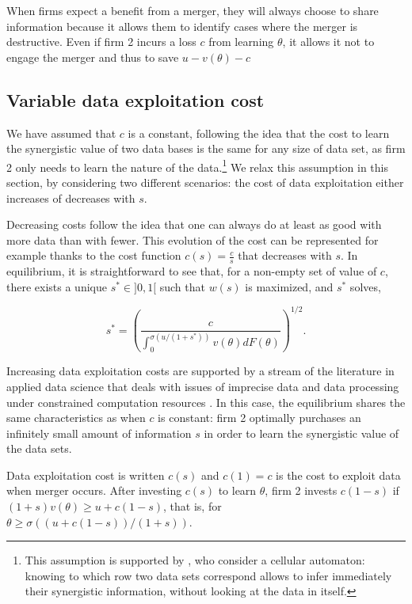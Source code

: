 \documentclass[a4paper,leqno]{article}%
\renewcommand{\t}{\theta}
\newcommand{\s}{\sigma}
\begin{document}
\medskip

When firms expect a benefit from a merger, they will always choose to share information because it allows them to identify cases where the merger is destructive. Even if firm 2 incurs a loss $c$ from learning $\t$, it allows it not to engage the merger and thus to save $u-v(\t)-c$

\medskip

\subsection{Variable data exploitation cost}

\medskip

We have assumed that $c$ is a constant, following the idea that the cost to learn the synergistic value of two data bases is the same for any size of data set, as firm 2 only needs to learn the nature of the data.\footnote{This assumption is supported by \cite{sootla2017analyzing}, who consider a cellular automaton: knowing to which row two data sets correspond allows to infer immediately their synergistic information, without looking at the data in itself.} We relax this assumption in this section, by considering two different scenarios: the cost of data exploitation either increases of decreases with $s$.

\medskip

Decreasing costs follow the idea that one can always do at least as good with more data than with fewer. This evolution of the cost can be represented for example thanks to the cost function $c(s)=\frac{c}{s}$ that decreases with $s$. In equilibrium, it is straightforward to see that, for a non-empty set of value of $c$, there exists a unique $s^*\in]0,1[$ such that $w(s)$ is maximized, and $s^*$ solves,

$$s^*=\left(\frac{c}{\int_0^{\s(u/(1+s^*))}v(\t)dF(\t)}\right)^{1/2}.$$

\medskip

Increasing data exploitation costs are supported by a stream of the literature in applied data science that deals with issues of imprecise data and data processing under constrained computation resources \citep{hernandez1995merge}. In this case, the equilibrium shares the same characteristics as when $c$ is constant: firm 2 optimally purchases an infinitely small amount of information $s$ in order to learn the synergistic value of the data sets.

\medskip

Data exploitation cost is written $c(s)$ and $c(1)=c$ is the cost to exploit data when merger occurs. After investing $c(s)$ to learn $\t$, firm 2 invests $c(1-s)$ if $(1+s)v(\t)\geq u+c(1-s)$, that is, for $\t\geq \s((u+c(1-s))/(1+s))$.
\end{document}
